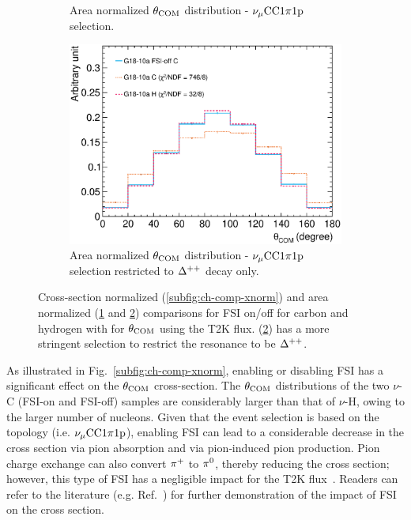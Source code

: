 \begin{figure}
\begin{subfigure}[ht!]{\trfigwid\textwidth}
          \caption{Area normalized $\theta_{\textrm{COM}}$ distribution - $\nu_{\mu}\textrm{CC}1\pi1\textrm{p}$ selection.}
          \label{subfig:ch-comp-com-cc1pi1p}
     \end{subfigure}
     \begin{subfigure}[ht!]{\trfigwid\textwidth}
          \centering
          \includegraphics[width=\textwidth]{figures/COM/anorm-CH-lfgdef-resonly_da_tan.eps}  
          \caption{Area normalized $\theta_{\textrm{COM}}$ distribution - $\nu_{\mu}\textrm{CC}1\pi1\textrm{p}$ selection restricted to $\Delta^{++}$ decay only.}
          \label{subfig:ch-comp-com-dpp}
     \end{subfigure}
     \caption{Cross-section normalized (\ref{subfig:ch-comp-xnorm}) and area normalized (\ref{subfig:ch-comp-com-cc1pi1p} and \ref{subfig:ch-comp-com-dpp}) comparisons for FSI on/off for carbon and hydrogen with \geta for $\theta_{\textrm{COM}}$ using the T2K flux. (\ref{subfig:ch-comp-com-dpp}) has a more stringent selection to restrict the resonance to be $\Delta^{++}$.}
     \label{fig:ch-comp}
     \end{figure}

     As illustrated in Fig.~\ref{subfig:ch-comp-xnorm}, enabling or disabling FSI has a significant effect on the $\theta_{\textrm{COM}}$ cross-section.
     The $\theta_{\textrm{COM}}$ distributions of the two $\nu$-C (FSI-on and FSI-off) samples are considerably larger than that of $\nu$-H, owing to the larger number of nucleons.
     Given that the event selection is based on the topology (i.e. $\nu_{\mu}\textrm{CC}1\pi1\textrm{p}$), enabling FSI can lead to a considerable decrease in the cross section via pion absorption and via pion‐induced pion production.
     Pion charge exchange can also convert $\pi^+$ to $\pi^0$, thereby reducing the cross section; however, this type of FSI has a negligible impact for the T2K flux~\cite{GENIE:2024ufm}.
     Readers can refer to the literature (e.g. Ref.~\cite{Filali:2024vpy}) for further demonstration of the impact of FSI on the cross section.


